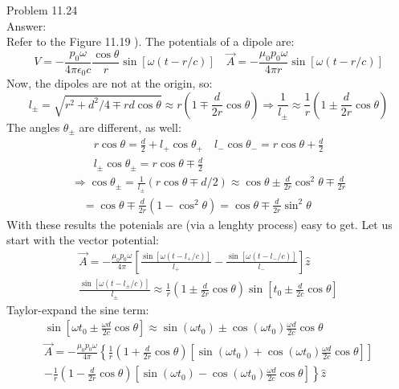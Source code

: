 \documentclass[UTF8]{ctexart}
\begin{document}
	Problem 11.24\\
	Answer:\\
	Refer to the Figure 11.19 ). The potentials of a dipole are:
	$$V=-\frac{p_{0} \omega}{4 \pi \epsilon_{0} c} \frac{\cos \theta}{r} \sin [\omega(t-r / c)] \quad \vec{A}=-\frac{\mu_{0} p_{0} \omega}{4 \pi r} \sin [\omega(t-r / c)]$$
	Now, the dipoles are not at the origin, so:
	$$l_{\pm}=\sqrt{r^{2}+d^{2} / 4 \mp r d \cos \theta} \approx r\left(1 \mp \frac{d}{2 r} \cos \theta\right) \Rightarrow \frac{1}{l_{\pm}} \approx \frac{1}{r}\left(1 \pm \frac{d}{2 r} \cos \theta\right)$$
	The angles $\theta_{\pm}$ are different, as well:
	$$\begin{array}{c}
	r \cos \theta=\frac{d}{2}+l_{+} \cos \theta_{+} \quad l_{-} \cos \theta_{-}=r \cos \theta+\frac{d}{2} \\
	l_{\pm} \cos \theta_{\pm}=r \cos \theta \mp \frac{d}{2}
	\end{array}$$
	$$\begin{array}{l}
	\Longrightarrow \cos \theta_{\pm}=\frac{1}{l_{\pm}}(r \cos \theta \mp d / 2) \approx \cos \theta \pm \frac{d}{2 r} \cos ^{2} \theta \mp \frac{d}{2 r} \\
	\quad=\cos \theta \mp \frac{d}{2 r}\left(1-\cos ^{2} \theta\right)=\cos \theta \mp \frac{d}{2 r} \sin ^{2} \theta
	\end{array}$$
	With these results the potenials are (via a lenghty process) easy to get. Let us start with the vector potential:
	$$\begin{array}{c}
	\vec{A}=-\frac{\mu_{0} p_{0} \omega}{4 \pi}\left[\frac{\sin \left[\omega\left(t-l_{+} / c\right)\right]}{l_{+}}-\frac{\sin \left[\omega\left(t-l_{-} / c\right)\right]}{l_{-}}\right] \hat{z} \\
	\frac{\sin \left[\omega\left(t-l_{\pm} / c\right)\right]}{l_{\pm}} \approx \frac{1}{r}\left(1 \pm \frac{d}{2 r} \cos \theta\right) \sin \left[t_{0} \pm \frac{d}{2 c} \cos \theta\right]
	\end{array}$$
	Taylor-expand the sine term:
	$$\begin{array}{c}
		\sin \left[\omega t_{0} \pm \frac{\omega d}{2 c} \cos \theta\right] \approx \sin \left(\omega t_{0}\right) \pm \cos \left(\omega t_{0}\right) \frac{\omega d}{2 c} \cos \theta \\
		\vec{A}=-\frac{\mu_{0} p_{0} \omega}{4 \pi}\left\{\frac{1}{r}\left(1+\frac{d}{2 r} \cos \theta\right)\left[\sin \left(\omega t_{0}\right)+\cos \left(\omega t_{0}\right) \frac{\omega d}{2 c} \cos \theta\right]\right] \\
		\left.-\frac{1}{r}\left(1-\frac{d}{2 r} \cos \theta\right)\left[\sin \left(\omega t_{0}\right)-\cos \left(\omega t_{0}\right) \frac{\omega d}{2 c} \cos \theta\right]\right\} \hat{z}
	\end{array}$$
\end{document}
